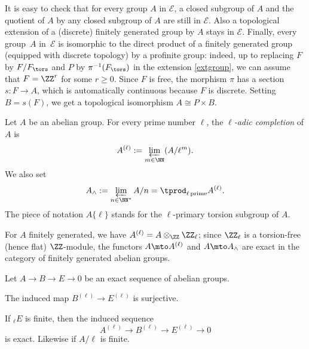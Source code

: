 It is easy to check that
for every group $A$ in $\mathcal E$, a closed subgroup of $A$ and
the quotient of $A$ by any closed subgroup of $A$ are still in $\mathcal E$.
Also a topological extension of a (discrete) finitely generated group by $A$
stays in $\mathcal E$. Finally, every group~$A$ in~$\mathcal E$ is isomorphic
to the direct product of a finitely generated
group (equipped with discrete topology) by a profinite group: indeed, up to replacing $F$ by
$F/F_\tors$ and $P$ by $\pi^{-1}(F_\tors)$
in the extension \eqref{extgroup}, we can assume
that $F=\ZZ^r$ for some $r \geq 0$. Since $F$ is free, the morphism
$\pi$ has a section $s: F \to A$, which is automatically continuous
because $F$ is discrete. Setting $B=s(F)$, we get a topological isomorphism
$A \cong P \times B$.

\begin{defi}
Let $A$ be an abelian group. For every prime number $\ell$,
the \emph{$\ell$-adic completion} of $A$ is
\[
A^{(\ell)}:=\varprojlim_{m \in \NN} (A/\ell^m).
\] We also
set
\[
A_{\wedge}:=\varprojlim_{n \in \NN^*}
A/n=\tprod_{\ell \, \mathrm{prime}} A^{(\ell)}.
\]
The piece of notation $A \{\ell\}$ stands for the $\ell$-primary
torsion subgroup of $A$.
\end{defi}

For $A$ finitely generated, we have
$A^{(\ell)}=A \otimes_{\ZZ} \ZZ_{\ell}$; since $\ZZ_{\ell}$ is a torsion-free
(hence flat) $\ZZ$-module, the functors $A \mto A^{(\ell)}$ and
$A \mto A_{\wedge}$ are exact in the category of finitely generated
abelian groups.

\pagebreak[2]
\begin{lem} \label{exactcomp}
Let $A \to B \to E \to 0$ be an exact sequence of abelian groups.
\begin{enumeratea}
\item\label{exactcompa}
The induced map $B^{(\ell)} \to E^{(\ell)}$ is surjective.

\item\label{exactcompb}
If $_{\ell} E$ is finite, then the induced sequence
\[
A^{(\ell)} \to B^{(\ell)} \to E^{(\ell)} \to 0
\]
is exact. Likewise if $A/\ell$ is finite.
\end{enumeratea}
\end{lem}

